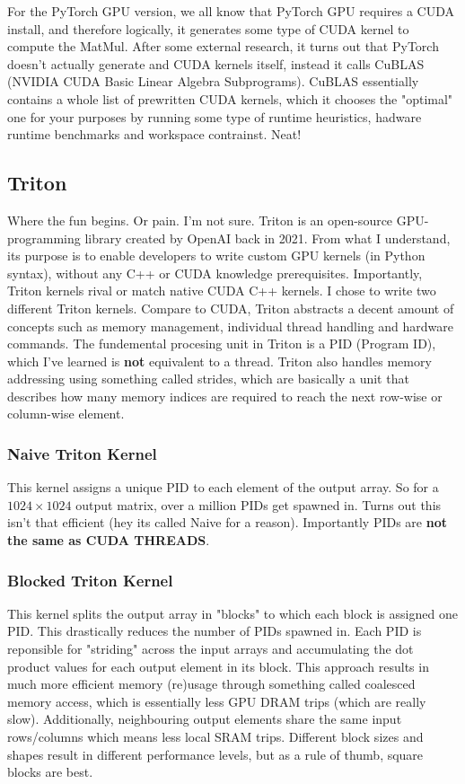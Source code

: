 \documentclass[11pt,letterpaper]{article}
\begin{document}
For the PyTorch GPU version, we all know that PyTorch GPU requires a CUDA install, and therefore logically, it generates some type of CUDA kernel to compute the MatMul. After some external research, it turns out that PyTorch doesn't actually generate and CUDA kernels itself, instead it calls CuBLAS (NVIDIA CUDA Basic Linear Algebra Subprograms). CuBLAS essentially contains a whole list of prewritten CUDA kernels, which it chooses the "optimal" one for your purposes by running some type of runtime heuristics, hadware runtime benchmarks and workspace contrainst. Neat!

\subsection{Triton}
Where the fun begins. Or pain. I'm not sure. Triton is an open-source GPU-programming library created by OpenAI back in 2021. From what I understand, its purpose is to enable developers to write custom GPU kernels (in Python syntax), without any C++ or CUDA knowledge prerequisites. Importantly, Triton kernels rival or match native CUDA C++ kernels. I chose to write two different Triton kernels. Compare to CUDA, Triton abstracts a decent amount of concepts such as memory management, individual thread handling and hardware commands. The fundemental procesing unit in Triton is a PID (Program ID), which I've learned is \textbf{not} equivalent to a thread. Triton also handles memory addressing using something called strides, which are basically a unit that describes how many memory indices are required to reach the next row-wise or column-wise element.

\subsubsection{Naive Triton Kernel}
This kernel assigns a unique PID to each element of the output array. So for a $1024 \times 1024$ output matrix, over a million PIDs get spawned in. Turns out this isn't that efficient (hey its called Naive for a reason). Importantly PIDs are \textbf{not the same as CUDA THREADS}. 

\subsubsection{Blocked Triton Kernel}
This kernel splits the output array in "blocks" to which each block is assigned one PID. This drastically reduces the number of PIDs spawned in. Each PID is reponsible for "striding" across the input arrays and accumulating the dot product values for each output element in its block. This approach results in much more efficient memory (re)usage through something called coalesced memory access, which is essentially less GPU DRAM trips (which are really slow). Additionally, neighbouring output elements share the same input rows/columns which means less local SRAM trips. Different block sizes and shapes result in different performance levels, but as a rule of thumb, square blocks are best.
\end{document}
